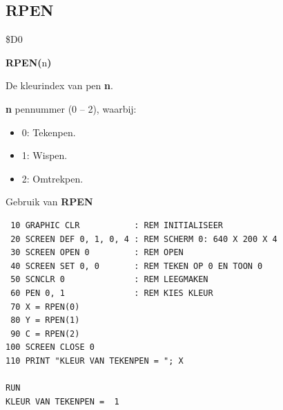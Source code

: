
\newpage
\subsection{RPEN}
\begin{description}[leftmargin=2cm,style=nextline]
\item [Token:]    \$D0

\item [Formaat:]   {\bf RPEN(}n{\bf)}

\item [Retourneert:]  De kleurindex van pen {\bf n}.

                  {\bf n} pennummer (0 -- 2), waarbij:

                  \begin{itemize}
                     \item 0: Tekenpen.                     \item 1: Wispen.                     \item 2: Omtrekpen.
                  \end{itemize}

\item [Voorbeeld:]  Gebruik van {\bf RPEN}

\begin{tcolorbox}[colback=black,coltext=white]
\verbatimfont{\codefont}
\begin{verbatim}
 10 GRAPHIC CLR           : REM INITIALISEER
 20 SCREEN DEF 0, 1, 0, 4 : REM SCHERM 0: 640 X 200 X 4
 30 SCREEN OPEN 0         : REM OPEN
 40 SCREEN SET 0, 0       : REM TEKEN OP 0 EN TOON 0
 50 SCNCLR 0              : REM LEEGMAKEN
 60 PEN 0, 1              : REM KIES KLEUR
 70 X = RPEN(0)
 80 Y = RPEN(1)
 90 C = RPEN(2)
100 SCREEN CLOSE 0
110 PRINT "KLEUR VAN TEKENPEN = "; X

RUN
KLEUR VAN TEKENPEN =  1
\end{verbatim}
\end{tcolorbox}
\end{description}


\newpage
